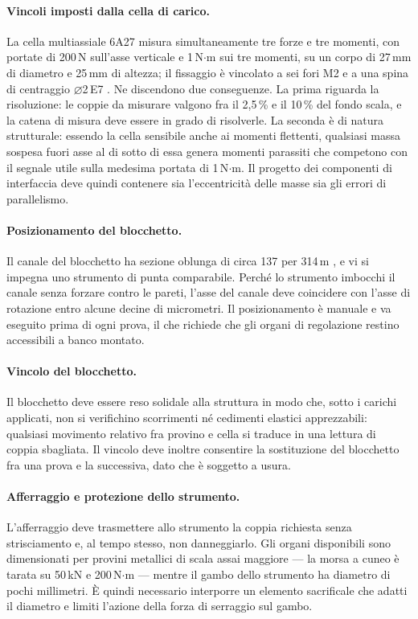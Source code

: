 \paragraph{Vincoli imposti dalla cella di carico.}
La cella multiassiale 6A27 misura simultaneamente tre forze e tre momenti, con
portate di 200\,N sull'asse verticale e 1\,N$\cdot$m sui tre momenti, su un corpo
di 27\,mm di diametro e 25\,mm di altezza; il fissaggio è vincolato a sei fori M2
e a una spina di centraggio $\varnothing$2\,E7 \cite{interface6a}. Ne discendono
due conseguenze.
La prima riguarda la risoluzione: le coppie da misurare valgono fra il 2,5\,\% e
il 10\,\% del fondo scala, e la catena di misura deve essere in grado di
risolverle. La seconda è di natura strutturale: essendo la cella sensibile anche
ai momenti flettenti, qualsiasi massa sospesa fuori asse al di sotto di essa
genera momenti parassiti che competono con il segnale utile sulla medesima
portata di 1\,N$\cdot$m. Il progetto dei componenti di interfaccia deve quindi contenere sia
l'eccentricità delle masse sia gli errori di parallelismo.

\paragraph{Posizionamento del blocchetto.}
Il canale del blocchetto ha sezione oblunga di circa 137 per 314\,\textmu m
\cite{smutny2022}, e vi si impegna uno strumento di punta comparabile. Perché lo
strumento imbocchi il canale senza forzare contro le pareti, l'asse del canale
deve coincidere con l'asse di rotazione entro alcune decine di micrometri. Il
posizionamento è manuale e va eseguito prima di ogni prova, il che richiede che
gli organi di regolazione restino accessibili a banco montato.

\paragraph{Vincolo del blocchetto.}
Il blocchetto deve essere reso solidale alla struttura in modo che, sotto i
carichi applicati, non si verifichino scorrimenti né cedimenti elastici
apprezzabili: qualsiasi movimento relativo fra provino e cella si traduce in una
lettura di coppia sbagliata. Il vincolo deve inoltre consentire la sostituzione
del blocchetto fra una prova e la successiva, dato che è soggetto a usura.

\paragraph{Afferraggio e protezione dello strumento.}
L'afferraggio deve trasmettere allo strumento la coppia richiesta senza
strisciamento e, al tempo stesso, non danneggiarlo. Gli organi disponibili sono
dimensionati per provini metallici di scala assai maggiore --- la morsa a cuneo è
tarata su 50\,kN e 200\,N$\cdot$m --- mentre il gambo dello strumento ha diametro
di pochi millimetri. È quindi necessario interporre un elemento sacrificale che
adatti il diametro e limiti l'azione della forza di serraggio sul gambo.

